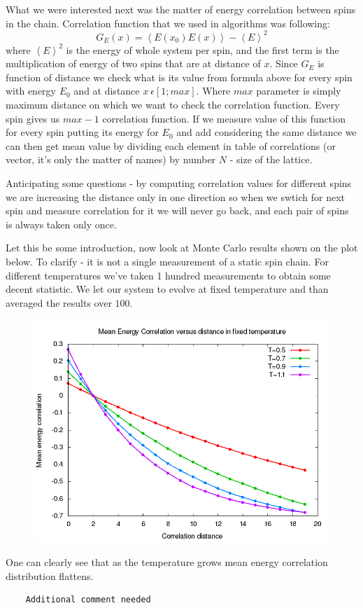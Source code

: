 \documentclass[a4paper,12pt,titlepage]{article}
\begin{document}
  What we were interested next was the matter of energy correlation between spins in the chain. Correlation function that we used in 
  algorithms was following:
  \begin{equation}
    G_E(x)=\left<E\left(x_0\right)E(x)\right>-\left<E\right>^2
  \end{equation}
  where $\left<E\right>^2$ is the energy of whole system per spin, and the first term is the multiplication of energy of two spins that
  are at distance of $x$. Since $G_E$ is function of distance we check what is its value from formula above for every spin with energy $E_0$
  and at distance $x\ \epsilon \left[1;max\right]$. Where $max$ parameter is simply maximum distance on which we want to check the 
  correlation function. Every spin gives us $max-1$ correlation function. If we measure value of this function for every spin putting 
  its energy for $E_0$ and add considering the same distance we can then get mean value by dividing each element in table of correlations
  (or vector, it's only the matter of names) by number $N$ - size of the lattice. 
  
  Anticipating some questions - by computing correlation values for different spins we are increasing the distance only in one direction
  so when we swtich for next spin and measure correlation for it we will never go back, and each pair of spins is always taken only once.
  
  \newpage
  Let this be some introduction, now look at Monte Carlo results shown on the plot below. To clarify - it is not a single measurement of
  a static spin chain. For different temperatures we've taken 1 hundred measurements to obtain some decent statistic. We let our system
  to evolve at fixed temperature and than averaged the results over $100$.
  \begin{figure}[h]
    \centering
    \includegraphics[scale=0.5]{plots/IsingTestMeanECorrelation_T.png}
  \end{figure}
  
  One can clearly see that as the temperature grows mean energy correlation distribution flattens.
  
  \begin{verbatim}
    Additional comment needed
  \end{verbatim}

  
  
\end{document}
